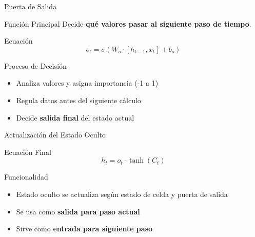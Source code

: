 \documentclass[
  ignorenonframetext,
]{beamer}
\providecommand{\tightlist}{%
  \setlength{\itemsep}{0pt}\setlength{\parskip}{0pt}}
\begin{document}
\begin{frame}{Puerta de Salida}
\label{puerta-de-salida}
\begin{block}{Función Principal}
\label{funciuxf3n-principal-2}
Decide \textbf{qué valores pasar al siguiente paso de tiempo}.
\end{block}

\begin{block}{Ecuación}
\label{ecuaciuxf3n-1}
\[o_t = \sigma(W_o \cdot [h_{t-1}, x_t] + b_o)\]
\end{block}

\begin{block}{Proceso de Decisión}
\label{proceso-de-decisiuxf3n}
\begin{itemize}
\tightlist
\item
  Analiza valores y asigna importancia (-1 a 1)
\item
  Regula datos antes del siguiente cálculo
\item
  Decide \textbf{salida final} del estado actual
\end{itemize}
\end{block}
\end{frame}

\begin{frame}{Actualización del Estado Oculto}
\label{actualizaciuxf3n-del-estado-oculto}
\begin{block}{Ecuación Final}
\label{ecuaciuxf3n-final}
\[h_t = o_t \cdot \tanh(C_t)\]
\end{block}

\begin{block}{Funcionalidad}
\label{funcionalidad}
\begin{itemize}
\tightlist
\item
  Estado oculto se actualiza según estado de celda y puerta de salida
\item
  Se usa como \textbf{salida para paso actual}
\item
  Sirve como \textbf{entrada para siguiente paso}
\end{itemize}
\end{block}
\end{frame}
\end{document}
